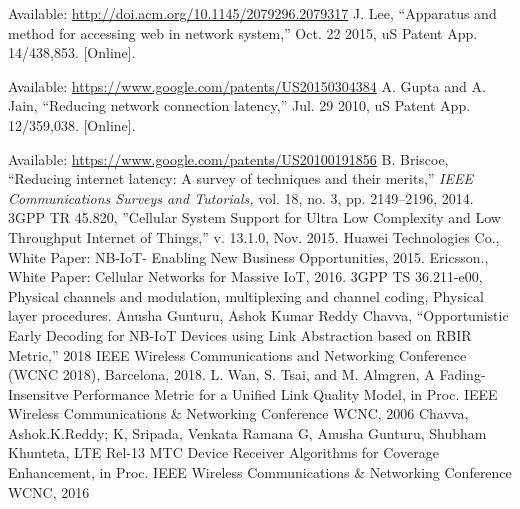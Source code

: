 \begin{multicols}{2}
\begin{thebibliography}{99}
Available: \url{http://doi.acm.org/10.1145/2079296.2079317}
 J. Lee, “Apparatus and method for accessing web in network system,” Oct. 22 2015, uS Patent App. 14/438,853. [Online].

Available: \url{https://www.google.com/patents/US20150304384}
 A. Gupta and A. Jain, “Reducing network connection latency,” Jul. 29 2010, uS Patent App. 12/359,038. [Online]. 

Available: \url{https://www.google.com/patents/US20100191856}
 B. Briscoe, “Reducing internet latency: A survey of techniques and their merits,” \textit{IEEE Communications Surveys and Tutorials,} vol. 18, no. 3, pp. 2149–2196, 2014.
 3GPP TR 45.820, ”Cellular System Support for Ultra Low Complexity and Low Throughput Internet of Things,” v. 13.1.0, Nov. 2015.
 Huawei Technologies Co., White Paper: NB-IoT- Enabling New Business Opportunities, 2015.
 Ericsson., White Paper: Cellular Networks for Massive IoT, 2016.
 3GPP TS 36.211-e00, Physical channels and modulation, multiplexing and channel coding, Physical layer procedures. 
 Anusha Gunturu, Ashok Kumar Reddy Chavva, “Opportunistic Early Decoding for NB-IoT Devices using Link Abstraction based on RBIR Metric,” 2018 IEEE Wireless Communications and Networking Conference (WCNC 2018), Barcelona, 2018. 
 L. Wan, S. Tsai, and M. Almgren, A Fading-Insensitve Performance Metric for a Unified Link Quality Model, in Proc. IEEE Wireless Communications \& Networking Conference WCNC, 2006 
 Chavva, Ashok.K.Reddy; K, Sripada, Venkata Ramana G, Anusha Gunturu, Shubham Khunteta, LTE Rel-13 MTC Device Receiver Algorithms for Coverage Enhancement, in Proc. IEEE Wireless Communications \& Networking Conference WCNC, 2016
\end{thebibliography}
\end{multicols}




